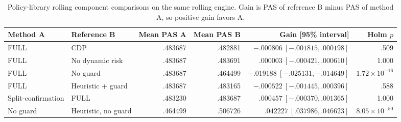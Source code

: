 \begin{table}[!htbp]
\centering\small
\caption{Policy-library rolling component comparisons on the same rolling engine. Gain is PAS of reference B minus PAS of method A, so positive gain favors A.}
\label{tab:rolling_ablation}
\begin{tabular}{llrrrr}
\toprule
Method A & Reference B & Mean PAS A & Mean PAS B & Gain [95\% interval] & Holm $p$\\
\midrule
FULL & CDP & .483687 & .482881 & $-.000806\ [-.001815,.000198]$ & .509\\
FULL & No dynamic risk & .483687 & .483691 & $.000003\ [-.000421,.000610]$ & 1.000\\
FULL & No guard & .483687 & .464499 & $-.019188\ [-.025131,-.014649]$ & $1.72\!\times\!10^{-16}$\\
FULL & Heuristic + guard & .483687 & .483165 & $-.000522\ [-.001445,.000396]$ & .588\\
Split-confirmation & FULL & .483230 & .483687 & $.000457\ [-.000370,.001365]$ & 1.000\\
No guard & Heuristic, no guard & .464499 & .506726 & $.042227\ [.037986,.046623]$ & $8.05\!\times\!10^{-50}$\\
\bottomrule
\end{tabular}
\end{table}
